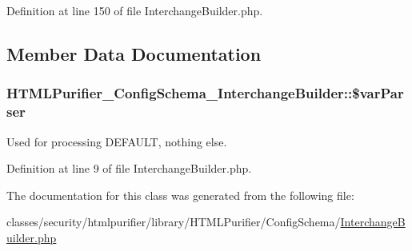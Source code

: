Definition at line 150 of file Interchange\+Builder.\+php.



\subsection{Member Data Documentation}
\hypertarget{classHTMLPurifier__ConfigSchema__InterchangeBuilder_afbc00b630518e882245d254a19d54ca8}{
\subsubsection[{\$var\+Parser}]{\setlength{\rightskip}{0pt plus 5cm}H\+T\+M\+L\+Purifier\+\_\+\+Config\+Schema\+\_\+\+Interchange\+Builder\+::\$var\+Parser\hspace{0.3cm}{\ttfamily [protected]}}}\label{classHTMLPurifier__ConfigSchema__InterchangeBuilder_afbc00b630518e882245d254a19d54ca8}
Used for processing D\+E\+F\+A\+U\+L\+T, nothing else. 

Definition at line 9 of file Interchange\+Builder.\+php.



The documentation for this class was generated from the following file\+:\begin{DoxyCompactItemize}
\item 
classes/security/htmlpurifier/library/\+H\+T\+M\+L\+Purifier/\+Config\+Schema/\hyperlink{InterchangeBuilder_8php}{Interchange\+Builder.\+php}\end{DoxyCompactItemize}
